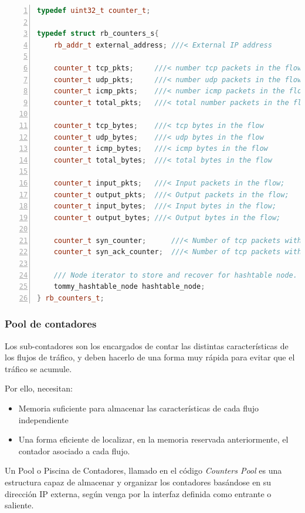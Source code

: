 \begin{lstlisting}[language=C++,caption={Estructura de contadores por flujo}, breaklines=true, 
label=code:RbCounter,numbers=left,float=htbp]
typedef uint32_t counter_t;

typedef struct rb_counters_s{
    rb_addr_t external_address; ///< External IP address

    counter_t tcp_pkts;     ///< number tcp packets in the flow
    counter_t udp_pkts;     ///< number udp packets in the flow
    counter_t icmp_pkts;    ///< number icmp packets in the flow
    counter_t total_pkts;   ///< total number packets in the flow

    counter_t tcp_bytes;    ///< tcp bytes in the flow
    counter_t udp_bytes;    ///< udp bytes in the flow
    counter_t icmp_bytes;   ///< icmp bytes in the flow
    counter_t total_bytes;  ///< total bytes in the flow

    counter_t input_pkts;   ///< Input packets in the flow;
    counter_t output_pkts;  ///< Output packets in the flow;
    counter_t input_bytes;  ///< Input bytes in the flow;
    counter_t output_bytes; ///< Output bytes in the flow;

    counter_t syn_counter;      ///< Number of tcp packets with syn flag enabled
    counter_t syn_ack_counter;  ///< Number of tcp packets with syn+ack flags enabled

    /// Node iterator to store and recover for hashtable node.
    tommy_hashtable_node hashtable_node;
} rb_counters_t;
\end{lstlisting}

\subsubsection{Pool de contadores}
Los sub-contadores son los encargados de contar las distintas características de los flujos de tráfico, y deben 
hacerlo de una forma muy rápida para evitar que el tráfico se acumule.

Por ello, necesitan:
\begin{itemize}
 \item Memoria suficiente para almacenar las características de cada flujo independiente
 \item Una forma eficiente de localizar, en la memoria reservada anteriormente, el contador asociado a cada flujo.
\end{itemize}

Un Pool o Piscina de Contadores, llamado en el código \emph{Counters Pool} es una 
estructura capaz de almacenar y organizar los contadores basándose en su dirección IP externa, según venga por la 
interfaz definida como entrante o saliente.

